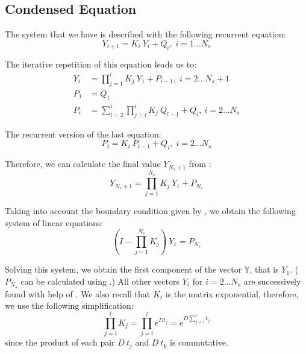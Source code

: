 \subsection{Condensed Equation}
The system that we have is described with the following recurrent equation:
\begin{equation} \label{eq:ce-recurrent}
  Y_{i + 1} = K_i \: Y_i + Q_i, \; i = 1 \dots N_s
\end{equation}

The iterative repetition of this equation leads us to:
\begin{align}
  Y_i & = \prod_{j = 1}^{i} K_j \: Y_1 + P_{i - 1}, \; i = 2 \dots N_s + 1 \label{eq:y-recurrent} \\
  P_1 & = Q_1 \nonumber \\
  P_i & = \sum_{l = 2}^i \prod_{j = l}^i K_j \: Q_{l - 1} + Q_i, \: i = 2 \dots N_s \nonumber
\end{align}

The recurrent version of the last equation:
\begin{equation} \label{eq:p-recurrent}
  P_i = K_i \: P_{i - 1} + Q_i, \; i = 2 \dots N_s
\end{equation}

Therefore, we can calculate the final value $Y_{N_s + 1}$ from :
\[
  Y_{N_s + 1} = \prod_{j = 1}^{N_s} K_j \: Y_1 + P_{N_s}
\]

Taking into account the boundary condition given by , we obtain the following system of linear equations:
\[
  (I - \prod_{j = 1}^{N_s} K_j) \: Y_1 = P_{N_s}
\]

Solving this system, we obtain the first component of the vector $\mathbb{Y}$, that is $Y_1$. ($P_{N_s}$ can be calculated using .) All other vectors $Y_i$ for $i = 2 \dots N_s$ are successively found with help of . We also recall that $K_i$ is the matrix exponential, therefore, we use the following simplification:
\[
  \prod_{j = i}^l K_j = \prod_{j = i}^l e^{D t_j} = e^{D \sum_{j = i}^l t_j}
\]
since the product of each pair $D \: t_j$ and $D \: t_k$ is commutative.


